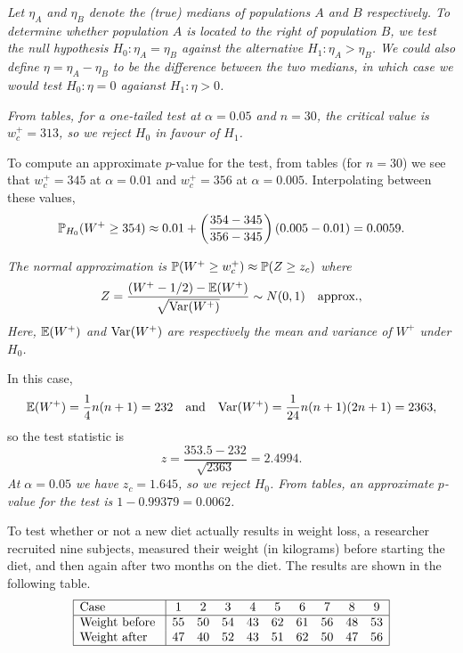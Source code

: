 \begin{exercise}
\begin{questions}
\begin{answer}
\ben
\it %
Let $\eta_A$ and $\eta_B$ denote the (true) medians of populations $A$ and $B$ respectively. To determine whether population $A$ is located to the right of population $B$, we test the null hypothesis $H_0:\eta_A=\eta_B$ against the alternative $H_1:\eta_A > \eta_B$. We could also define $\eta=\eta_A-\eta_B$ to be the difference between the two medians, in which case we would test $H_0:\eta=0$ agaianst $H_1:\eta>0$. 

\it %
From tables, for a one-tailed test at $\alpha=0.05$ and $n=30$, the critical value is $w^{+}_c = 313$, so we reject $H_0$ in favour of $H_1$.

To compute an approximate $p$-value for the test, from tables (for $n=30$) we see that $w^{+}_c = 345$ at $\alpha=0.01$ and $w^{+}_c = 356$ at $\alpha=0.005$. Interpolating between these values, 
\[
\mathbb{P}_{H_0}(W^{+}\geq 354) \approx 0.01 + \left(\frac{354-345}{356-345}\right)(0.005 - 0.01) = 0.0059.
\]

\it %
The normal approximation is $\mathbb{P}(W^{+}\geq w^{+}_c) \approx \mathbb{P}(Z\geq z_c)$ where
\[
Z = \frac{(W^{+}-1/2) - \mathbb{E}(W^{+})}{\sqrt{\text{Var}(W^{+})}} \sim N (0,1) \quad\text{approx.},
\]
Here, $\mathbb{E}(W^{+})$ and $\text{Var}(W^{+})$ are respectively the mean and variance of $W^{+}$ under $H_0$. 
\par
In this case,
\[
\mathbb{E}(W^{+}) = \frac{1}{4}n(n+1) = 232
\quad\text{and}\quad
\text{Var}(W^{+})  = \frac{1}{24}n(n+1)(2n+1) = 2363,
\]
so the test statistic is 
\[
z = \frac{353.5 - 232}{\sqrt{2363}} = 2.4994.
\]
\bit
\it At $\alpha=0.05$ we have $z_c = 1.645$, so we reject $H_0$. 
\it From tables, an approximate $p$-value for the test is $1-0.99379 = 0.0062$.
\eit
\een
\end{answer}

\question
To test whether or not a new diet actually results in weight loss, a researcher recruited nine subjects, measured their weight (in kilograms) before starting the diet, and then again after two months on the diet. The results are shown in the following table.
\[\begin{array}{|l|ccccccccc|} \hline
\text{Case}			&  1 &  2 &  3 &  4 &  5 &  6 &  7 &  8 &  9 \\ \hline
\text{Weight before }	& 55 & 50 & 54 & 43 & 62 & 61 & 56 & 48 & 53 \\
\text{Weight after }		& 47 & 40 & 52 & 43 & 51 & 62 & 50 & 47 & 56 \\ \hline
\end{array}\]


\end{questions}
\end{exercise}
